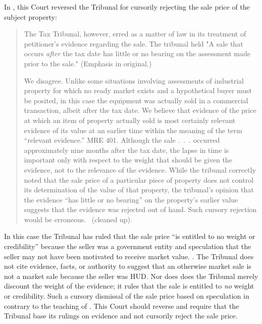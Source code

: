 \documentclass[12pt,\documentclassflag]{michiganCourtOfAppealsBrief}
\begin{document}
In \cite[s]{Jones & Laughlin}, this Court reversed the Tribunal for cursorily rejecting the sale price of the subject property:


\begin{quotation}
The Tax Tribunal, however, erred as a matter of law in its treatment of petitioner's evidence regarding the sale. The tribunal held "A sale that occurs {\em after} the tax date has little or no bearing on the assessment made prior to the sale." (Emphasis in original.)

We disagree. Unlike some situations involving assessments of industrial property for which no ready market exists and a hypothetical buyer must be posited, in this case the equipment was actually sold in a commercial transaction, albeit after the tax date.
We believe that evidence of the price at which an item of property actually sold is most certainly relevant evidence of its value at an earlier time within the meaning of the term ``relevant evidence.'' MRE 401. Although the sale .~.~. occurred approximately nine months after the tax date, the lapse in time is important only with respect to the weight that should be given the evidence, not to the relevance of the evidence. While the tribunal correctly noted that the sale price of a particular piece of property does not control its determination of the value of that property, the tribunal's opinion that the evidence ``has little or no bearing'' on the property's earlier value suggests that the evidence was rejected out of hand. Such cursory rejection would be erroneous. \ (cleaned up).
\end{quotation}

In this case the Tribunal has ruled that the sale price ``is entitled to no weight or credibility'' because the seller was a government entity and speculation that the seller may not have been motivated to receive market value. \reconsiderationDenied[2]. The Tribunal does not cite evidence, facts, or authority to suggest that an otherwise market sale is not a market sale because the seller was HUD. Nor does does the Tribunal merely discount the weight of the evidence; it rules that the sale is entitled to {\em no} weight or credibility. Such a cursory dismissal of the sale price based on speculation in contrary to the teaching of \cite[s]{Jones & Laughlin}. This Court should reverse and require that the Tribunal base its rulings on evidence and not cursorily reject the sale price. 
\end{document}

